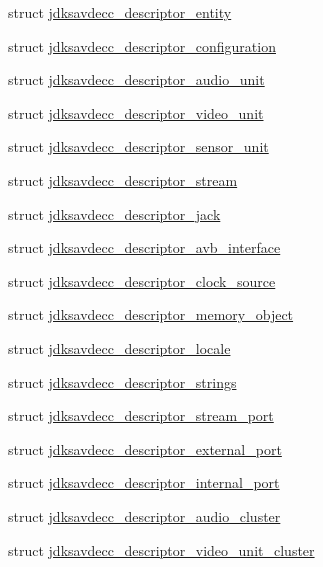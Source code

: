 \begin{DoxyCompactItemize}
struct \hyperlink{structjdksavdecc__descriptor__entity}{jdksavdecc\+\_\+descriptor\+\_\+entity}
\item 
struct \hyperlink{structjdksavdecc__descriptor__configuration}{jdksavdecc\+\_\+descriptor\+\_\+configuration}
\item 
struct \hyperlink{structjdksavdecc__descriptor__audio__unit}{jdksavdecc\+\_\+descriptor\+\_\+audio\+\_\+unit}
\item 
struct \hyperlink{structjdksavdecc__descriptor__video__unit}{jdksavdecc\+\_\+descriptor\+\_\+video\+\_\+unit}
\item 
struct \hyperlink{structjdksavdecc__descriptor__sensor__unit}{jdksavdecc\+\_\+descriptor\+\_\+sensor\+\_\+unit}
\item 
struct \hyperlink{structjdksavdecc__descriptor__stream}{jdksavdecc\+\_\+descriptor\+\_\+stream}
\item 
struct \hyperlink{structjdksavdecc__descriptor__jack}{jdksavdecc\+\_\+descriptor\+\_\+jack}
\item 
struct \hyperlink{structjdksavdecc__descriptor__avb__interface}{jdksavdecc\+\_\+descriptor\+\_\+avb\+\_\+interface}
\item 
struct \hyperlink{structjdksavdecc__descriptor__clock__source}{jdksavdecc\+\_\+descriptor\+\_\+clock\+\_\+source}
\item 
struct \hyperlink{structjdksavdecc__descriptor__memory__object}{jdksavdecc\+\_\+descriptor\+\_\+memory\+\_\+object}
\item 
struct \hyperlink{structjdksavdecc__descriptor__locale}{jdksavdecc\+\_\+descriptor\+\_\+locale}
\item 
struct \hyperlink{structjdksavdecc__descriptor__strings}{jdksavdecc\+\_\+descriptor\+\_\+strings}
\item 
struct \hyperlink{structjdksavdecc__descriptor__stream__port}{jdksavdecc\+\_\+descriptor\+\_\+stream\+\_\+port}
\item 
struct \hyperlink{structjdksavdecc__descriptor__external__port}{jdksavdecc\+\_\+descriptor\+\_\+external\+\_\+port}
\item 
struct \hyperlink{structjdksavdecc__descriptor__internal__port}{jdksavdecc\+\_\+descriptor\+\_\+internal\+\_\+port}
\item 
struct \hyperlink{structjdksavdecc__descriptor__audio__cluster}{jdksavdecc\+\_\+descriptor\+\_\+audio\+\_\+cluster}
\item 
struct \hyperlink{structjdksavdecc__descriptor__video__unit__cluster}{jdksavdecc\+\_\+descriptor\+\_\+video\+\_\+unit\+\_\+cluster}

\end{DoxyCompactItemize}
